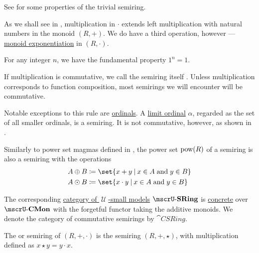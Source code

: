 \begin{definition}
\begin{thmenum}
    See  for some properties of the trivial semiring.

     As we shall see in , multiplication in \( \cdot \) extends left multiplication with natural numbers in the monoid \( (R, +) \). We do have a third operation, however --- \hyperref[def:monoid/exponentiation]{monoid exponentiation} in \( (R, \cdot) \).

    For any integer \( n \), we have the fundamental property \( 1^n = 1 \).

     If multiplication is commutative, we call the semiring itself . Unless multiplication corresponds to function composition, most semirings we will encounter will be commutative.

    Notable exceptions to this rule are \hyperref[def:ordinal]{ordinals}. A \hyperref[def:successor_and_limit_ordinal]{limit ordinal} \( \alpha \), regarded as the set of all smaller ordinals, is a semiring. It is not commutative, however, as shown in .

     Similarly to power set magmas defined in , the power set \( \operatorname{pow}(R) \) of a semiring is also a semiring with the operations
    \begin{align*}
      A \oplus B &\coloneqq \set{ x + y \given x \in A \T{and} y \in B } \\
      A \odot B  &\coloneqq \set{ x \cdot y \given x \in A \T{and} y \in B }
    \end{align*}

     The corresponding \hyperref[def:category_of_small_first_order_models]{category of \( \mscrU \)-small models} \( \ucat{SRing} \) is \hyperref[def:concrete_category]{concrete} over \hyperref[def:monoid]{\( \ucat{CMon} \)} with the forgetful functor taking the additive monoids. We denote the category of commutative semirings by \( \cat{CSRing} \).

     The  or  semiring of \( (R, +, \cdot) \) is the semiring \( (R, +, \star) \), with multiplication defined as \( x \star y = y \cdot x \).
  \end{thmenum}
\end{definition}

